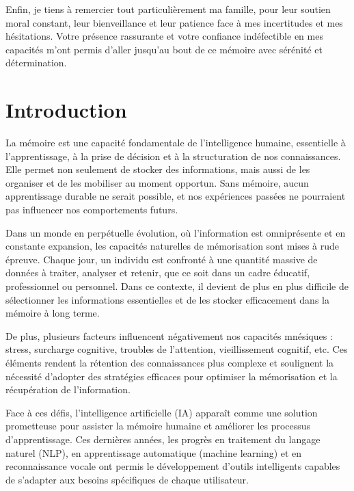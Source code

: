 \documentclass[12pt,a4paper]{report}
\begin{document}
Enfin, je tiens à remercier tout particulièrement ma famille, pour leur soutien moral constant, leur bienveillance et leur patience face à mes incertitudes et mes hésitations. Votre présence rassurante et votre confiance indéfectible en mes capacités m’ont permis d’aller jusqu’au bout de ce mémoire avec sérénité et détermination.

\chapter*{Introduction}

La mémoire est une capacité fondamentale de l’intelligence humaine, essentielle à l’apprentissage, à la prise de décision et à la structuration de nos connaissances. Elle permet non seulement de stocker des informations, mais aussi de les organiser et de les mobiliser au moment opportun. Sans mémoire, aucun apprentissage durable ne serait possible, et nos expériences passées ne pourraient pas influencer nos comportements futurs.

Dans un monde en perpétuelle évolution, où l’information est omniprésente et en constante expansion, les capacités naturelles de mémorisation sont mises à rude épreuve. Chaque jour, un individu est confronté à une quantité massive de données à traiter, analyser et retenir, que ce soit dans un cadre éducatif, professionnel ou personnel. Dans ce contexte, il devient de plus en plus difficile de sélectionner les informations essentielles et de les stocker efficacement dans la mémoire à long terme.

De plus, plusieurs facteurs influencent négativement nos capacités mnésiques : stress, surcharge cognitive, troubles de l’attention, vieillissement cognitif, etc. Ces éléments rendent la rétention des connaissances plus complexe et soulignent la nécessité d’adopter des stratégies efficaces pour optimiser la mémorisation et la récupération de l’information.

Face à ces défis, l’intelligence artificielle (IA) apparaît comme une solution prometteuse pour assister la mémoire humaine et améliorer les processus d’apprentissage. Ces dernières années, les progrès en traitement du langage naturel (NLP), en apprentissage automatique (machine learning) et en reconnaissance vocale ont permis le développement d’outils intelligents capables de s’adapter aux besoins spécifiques de chaque utilisateur.
\end{document}
